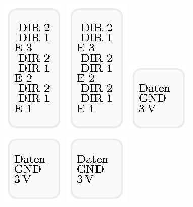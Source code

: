 \documentclass[12pt, a4paper, twoside, openright]{report}
\begin{document}
\thispagestyle{empty}

\begin{figure}[h]
	\centering
		\includegraphics[scale=1]{aufkl_motor} 		
		\includegraphics[scale=1]{aufkl_motor}
		\includegraphics[scale=1]{aufkl_phototransistor}
		\includegraphics[scale=1]{aufkl_phototransistor}
		\includegraphics[scale=1]{aufkl_phototransistor}

\end{figure}
\end{document}

